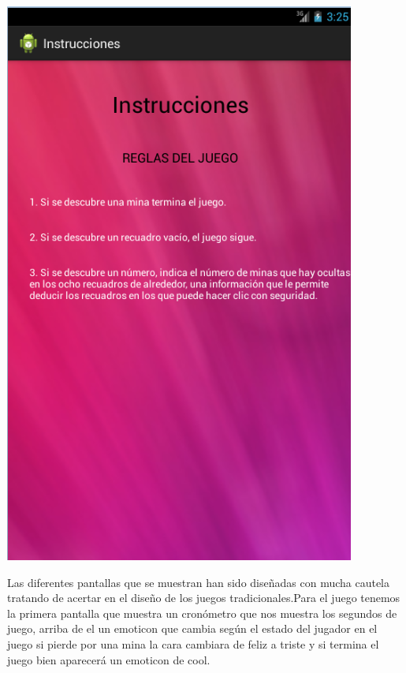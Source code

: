 \begin{center}
\includegraphics{image_buscamina/pantallaInstrucciones}


\end{center}

Las  diferentes pantallas que se muestran han sido diseñadas con mucha cautela tratando de acertar en el diseño de los juegos tradicionales.Para el juego tenemos la primera pantalla que muestra un cronómetro que nos muestra los segundos de juego,  arriba de el un emoticon que cambia según el estado del jugador en el juego si pierde por una mina la cara cambiara de feliz a triste y si termina el juego bien aparecerá un emoticon de cool.

